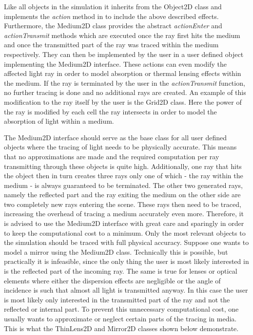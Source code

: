 \documentclass[a4paper,10pt]{article}
\begin{document}
    Like all objects in the simulation it inherits from the 
    Object2D class and implements the \emph{action} method in to
    include the above described effects.
    Furthermore, the Medium2D class provides the abstract \emph{actionEnter}
    and \emph{actionTransmit} methods which are executed
    once the ray first hits the medium and once the transmitted part
    of the ray was traced within the medium respectively.
    They can then be implemented by the user in a user defined object
    implementing the Medium2D interface.
    These actions can even modify the affected light ray in order
    to model absorption or thermal lensing effects within the medium.
    If the ray is terminated by the user in the \emph{actionTransmit}
    function, no further tracing is done and no additional rays
    are created.
    An example of this modification to the ray itself by the user
    is the Grid2D class.
    Here the power of the ray is modified by each cell the ray intersects 
    in order to model the absorption of light within a medium.

    The Medium2D interface should serve as the base class for all
    user defined objects where the tracing of light needs to
    be physically accurate.
    This means that no approximations are made and the required
    computation per ray transmitting through these objects is quite
    high.
    Additionally, one ray that hits the object then in turn creates
    three rays only one of which - the ray within the medium - is always
    guaranteed to be terminated.
    The other two generated rays, namely the reflected part and the
    ray exiting the medium on the other side are two completely
    new rays entering the scene.
    These rays then need to be traced, increasing the overhead
    of tracing a medium accurately even more.
    Therefore, it is advised to use the Medium2D interface with
    great care and sparingly in order to keep the computational
    cost to a minimum.
    Only the most relevant objects to the simulation should be
    traced with full physical accuracy.
    Suppose one wants to model a mirror using the Medium2D class.
    Technically this is possible, but practically it is infeasible,
    since the only thing the user is most likely interested in
    is the reflected part of the incoming ray.
    The same is true for lenses or optical elements where either
    the dispersion effects are negligible or the angle of
    incidence is such that almost all light is transmitted
    anyway.
    In this case the user is most likely only interested in the
    transmitted part of the ray and not the reflected or internal
    part.
    To prevent this unnecessary computational cost, one usually
    wants to approximate or neglect certain parts of the
    tracing in media.
    This is what the ThinLens2D and Mirror2D classes shown below
    demonstrate.
\end{document}
